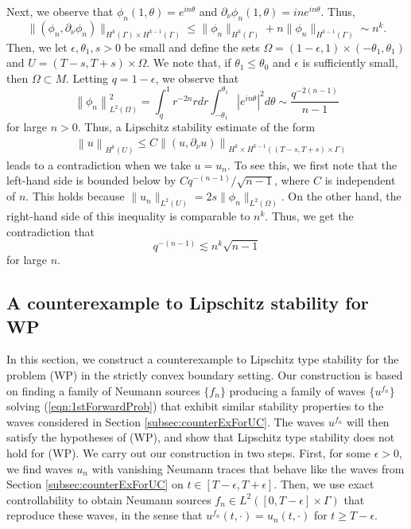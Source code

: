 \documentclass[final,leqno]{siamart1116}
\begin{document}
Next, we observe that $\phi_n(1,\theta) = e^{in\theta}$ and ${\partial}_\nu \phi_n(1,
\theta) = i n e^{in\theta}$. Thus,
\begin{equation*}
  \|(\phi_n,{\partial}_\nu \phi_n)\|_{H^k(\Gamma)\times H^{k-1}(\Gamma)} \leq  \|\phi_n\|_{H^k(\Gamma)} +  n \|\phi_n\|_{H^{k-1}(\Gamma)} \sim n^k.
\end{equation*}
Then, we let $\epsilon, \theta_1, s > 0$ be small and define the sets $\Omega =
(1-\epsilon,1) \times (-\theta_1,\theta_1)$ and $U = (T-s,T+s) \times
\Omega$. We note that, if $\theta_1 \le \theta_0$ and $\epsilon$ is
sufficiently small, then $\Omega \subset M$. Letting $q =
1-\epsilon$, we observe that
$$
{\left\|{\phi_n} \right\|}_{L^2(\Omega)}^2 = 
\int_{q}^1 r^{-2n}  rdr \int_{-\theta_1}^{\theta_1} |e^{i n \theta}|^2 d\theta \sim \frac{q^{-2(n-1)}}{n-1}
$$ for large $n > 0$.  Thus, a Lipschitz stability estimate of
the form
\begin{align*}
  &{\left\|{u} \right\|}_{H^k(U)} \le C {\left\|{(u,{\partial}_\nu u)} \right\|}_{H^k \times
    H^{k-1}((T-s,T+s) \times \Gamma)}
\end{align*}
leads to a contradiction when we take $u = u_n$. To see this, we first note that the left-hand side is bounded below by
$C q^{-(n-1)}/\sqrt{n-1}$, where $C$ is independent of $n$. This holds
because $\|u_n\|_{L^2(U)} = 2s\|\phi_n\|_{L^2(\Omega)}$. On the other
hand, the right-hand side of this inequality is comparable to $n^{k}$.
Thus, we get the contradiction that
\begin{equation*}
  q^{-(n-1)} \lesssim n^k\sqrt{n-1}
\end{equation*}
for large $n$.

\subsection{A counterexample to Lipschitz stability for WP}

In this section, we construct a counterexample to Lipschitz type
stability for the problem (WP) in the strictly convex boundary
setting. Our construction is based on finding a family of Neumann
sources $\{f_n\}$ producing a family of waves $\{u^{f_n}\}$ solving
(\ref{eqn:1stForwardProb}) that exhibit similar stability properties
to the waves considered in Section \ref{subsec:counterExForUC}. The
waves $u^{f_n}$ will then satisfy the hypotheses of (WP), and show
that Lipschitz type stability does not hold for (WP).  We carry out
our construction in two steps.  First, for some $\epsilon > 0$, we
find waves $u_n$ with vanishing Neumann traces that behave like the
waves from Section \ref{subsec:counterExForUC} on $t \in
[T-\epsilon,T+\epsilon]$.  Then, we use exact controllability to
obtain Neumann sources $f_n \in L^2([0,T-\epsilon]\times\Gamma)$ that
reproduce these waves, in the sense that $u^{f_n}(t,\cdot) =
u_n(t,\cdot)$ for $t \geq T-\epsilon$.
\end{document}
